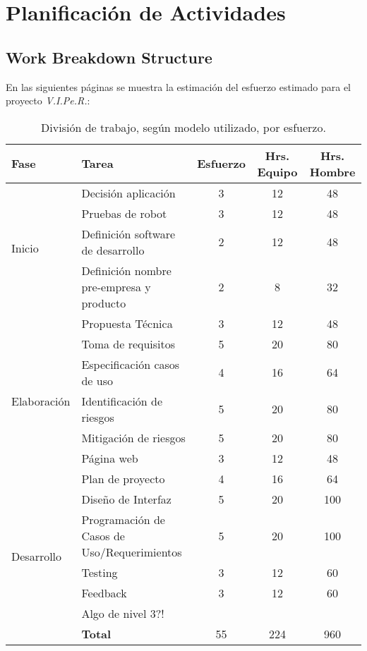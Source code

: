\appendix
\clearpage
\addappheadtotoc
\appendixpage

\chapter{Planificaci\'on de Actividades}
\label{appen:planificacion}

\newpage
\section[WBS]{Work Breakdown Structure}
\label{section:wbs}

En las siguientes p\'aginas se muestra la estimaci\'on del esfuerzo estimado para el proyecto \emph{V.I.Pe.R.}:

\begin{table}[H]
  \centering
  \begin{tabular}{|l|m{5cm}|c|c|c|}\hline
    {\bf Fase} & {\bf Tarea} & {\bf Esfuerzo} & {\bf Hrs. Equipo} & {\bf Hrs. Hombre}\\\hline
    \multirow{4}{*}{Inicio} & Decisi\'on aplicaci\'on                & 3 & 12 & 48\\\cline{2-5}
           & Pruebas de robot                   & 3 & 12 & 48\\\cline{2-5}
           & Definici\'on software de desarrollo  & 2 & 12 & 48\\\cline{2-5}
           & Definici\'on nombre pre-empresa y producto & 2 & 8 & 32\\\hline
    \multirow{7}{*}{Elaboraci\'on} & Propuesta T\'ecnica           & 3 & 12 & 48\\\cline{2-5}
                & Toma de requisitos          & 5 & 20 & 80\\\cline{2-5}
                & Especificaci\'on casos de uso & 4 & 16 & 64\\\cline{2-5}
                & Identificaci\'on de riesgos   & 5 & 20 & 80\\\cline{2-5}
                & Mitigaci\'on de riesgos       & 5 & 20 & 80\\\cline{2-5}
                & P\'agina web                  & 3 & 12 & 48\\\cline{2-5}
                & Plan de proyecto            & 4 & 16 & 64\\\hline
    \multirow{5}{*}{Desarrollo} & Dise\~no de Interfaz                            & 5 & 20 & 100\\\cline{2-5}
               & Programaci\'on de Casos de Uso/Requerimientos   & 5 & 20 & 100\\\cline{2-5}
               & Testing                                       & 3 & 12 & 60\\\cline{2-5}
               & Feedback                                      & 3 & 12 & 60\\\cline{2-5}
               & Algo de nivel 3?!                             &   &    &\\\hline
                & {\bf Total}                 & 55 & 224 & 960\\\hline
  \end{tabular}
  \label{tab:wbs}
  \caption[Tabla WBS]{Divisi\'on de trabajo, seg\'un modelo utilizado, por esfuerzo.}
\end{table}
